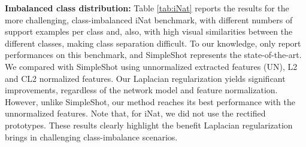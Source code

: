 \documentclass{article}
\begin{document}
\textbf{Imbalanced class distribution:} Table \ref{tab:iNat} reports the results for the more challenging, class-imbalanced iNat benchmark, with different numbers of support examples per class and, also, with high visual similarities between the different classes, making class separation difficult. To our knowledge, only \cite{wertheimer2019few,wang2019simpleshot} report performances on this benchmark, and SimpleShot \cite{wang2019simpleshot} represents the state-of-the-art. We compared with SimpleShot using unnormalized extracted features (UN), L2 and CL2 normalized features. Our Laplacian regularization yields significant improvements, regardless of the network model and feature normalization. However, unlike SimpleShot, our method reaches its best performance with the unnormalized features. Note that, for iNat, we did not use the rectified prototypes. These results clearly highlight the benefit Laplacian regularization brings in challenging class-imbalance scenarios.
\begin{table}
\caption{Average inference time (in seconds) for the 5-shot tasks in \textit{mini}Imagenet dataset.}
\label{tab:timing}
\vskip 0.1in
\begin{center}
\begin{small}
\end{small}
\end{center}
\vskip -0.25in
\end{table}
\end{document}
